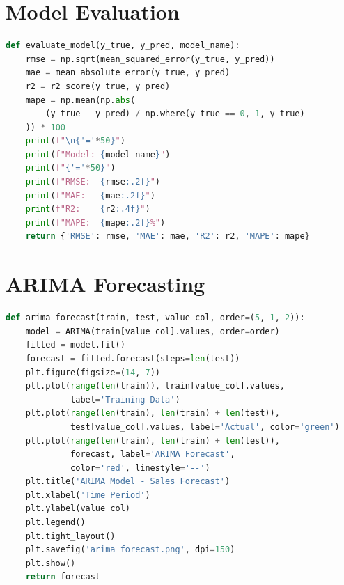 \documentclass[12pt,a4paper]{report}
\begin{document}
\section{Model Evaluation}
\begin{lstlisting}[language=Python, caption={Evaluation metrics calculation}]
def evaluate_model(y_true, y_pred, model_name):
    rmse = np.sqrt(mean_squared_error(y_true, y_pred))
    mae = mean_absolute_error(y_true, y_pred)
    r2 = r2_score(y_true, y_pred)
    mape = np.mean(np.abs(
        (y_true - y_pred) / np.where(y_true == 0, 1, y_true)
    )) * 100
    print(f"\n{'='*50}")
    print(f"Model: {model_name}")
    print(f"{'='*50}")
    print(f"RMSE:  {rmse:.2f}")
    print(f"MAE:   {mae:.2f}")
    print(f"R2:    {r2:.4f}")
    print(f"MAPE:  {mape:.2f}%")
    return {'RMSE': rmse, 'MAE': mae, 'R2': r2, 'MAPE': mape}
\end{lstlisting}

\section{ARIMA Forecasting}
\begin{lstlisting}[language=Python, caption={ARIMA model training and forecasting}]
def arima_forecast(train, test, value_col, order=(5, 1, 2)):
    model = ARIMA(train[value_col].values, order=order)
    fitted = model.fit()
    forecast = fitted.forecast(steps=len(test))
    plt.figure(figsize=(14, 7))
    plt.plot(range(len(train)), train[value_col].values,
             label='Training Data')
    plt.plot(range(len(train), len(train) + len(test)),
             test[value_col].values, label='Actual', color='green')
    plt.plot(range(len(train), len(train) + len(test)),
             forecast, label='ARIMA Forecast',
             color='red', linestyle='--')
    plt.title('ARIMA Model - Sales Forecast')
    plt.xlabel('Time Period')
    plt.ylabel(value_col)
    plt.legend()
    plt.tight_layout()
    plt.savefig('arima_forecast.png', dpi=150)
    plt.show()
    return forecast
\end{lstlisting}
\end{document}
